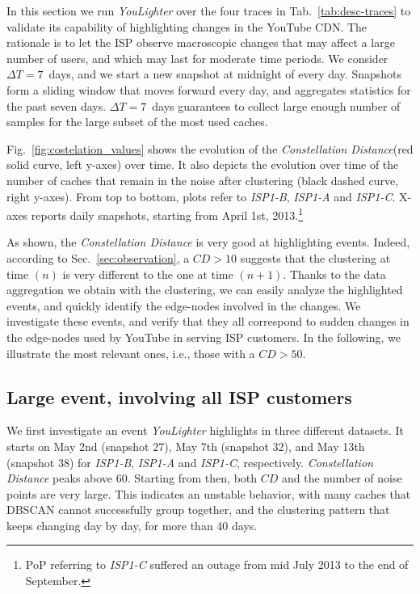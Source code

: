 \documentclass{acm_proc_article-sp}
\newcommand{\tool}{\textit{YouLighter}\xspace}
\newcommand{\distance}{\textit{Constellation Distance}\xspace}
\newcommand{\nodes}{{edge-nodes}\xspace}
\newcommand{\TApub}{\textit{ISP1-A}\xspace}
\newcommand{\TApri}{\textit{ISP1-B}\xspace}
\newcommand{\TBpub}{\textit{ISP1-C}\xspace}
\begin{document}
In this section we run \tool over the four traces in Tab.~\ref{tab:desc-traces} to validate its capability of highlighting changes in the YouTube CDN.
The rationale is to let the ISP observe macroscopic changes that may affect a large number of users, and which may last for moderate time periods.
We consider $\Delta T=7$~days, and we start a new snapshot at midnight of every day. Snapshots form a sliding window that moves forward every day, and aggregates statistics for the past seven days. $\Delta T=7$~days guarantees to collect large enough number of samples for the large subset of the most used caches.

Fig.~\ref{fig:costelation_values} shows the evolution of the \distance (red solid curve, left y-axes) over time. It also depicts the evolution over time of the number of caches that remain in the noise after clustering (black dashed curve, right y-axes). From top to bottom, plots refer to \TApri, \TApub and \TBpub. X-axes reports daily snapshots, starting from April 1st, 2013.\footnote{PoP referring to \TBpub suffered an outage from mid July 2013 to the end of September.}

As shown, the \distance is very good at highlighting events. 
Indeed, according to Sec.~\ref{sec:observation}, a $CD>10$ suggests that the clustering at time $(n)$ is very different to the one at time $(n+1)$. Thanks to the data aggregation we obtain with the clustering, we can easily analyze the highlighted events, and quickly identify the edge-nodes involved in the changes. We investigate these events, and verify that they all correspond to sudden changes in the \nodes used by YouTube in serving ISP customers. In the following, we illustrate the most relevant ones, i.e., those with a $CD>50$.



\subsection{Large event, involving all ISP customers}
We first investigate an event \tool highlights in three different datasets. It starts on May 2nd (snapshot 27), May 7th (snapshot 32), and May 13th (snapshot 38) for \TApri, \TApub and \TBpub, respectively. \distance peaks above 60. Starting from then, both $CD$ and the number of noise points are very large. This indicates an unstable behavior, with many caches that DBSCAN cannot successfully group together, and the clustering pattern that keeps changing day by day, for more than 40 days.
\end{document}
